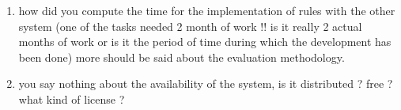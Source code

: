 \begin{enumerate}[leftmargin=0mm,label=\bfseries CommentR1.\arabic*]
\item \label{Review1.5} 
how did you compute the time for the implementation of rules 
with the other system (one of the tasks needed 2 month of work 
!! is it really 2 actual months of work or is it the period of 
time during which the development has been done)
more should be said about the evaluation methodology.


\item \label{Review1.5}
you say nothing about the availability of the system, 
is it distributed ? free ? what kind of license ?


\end{enumerate}
